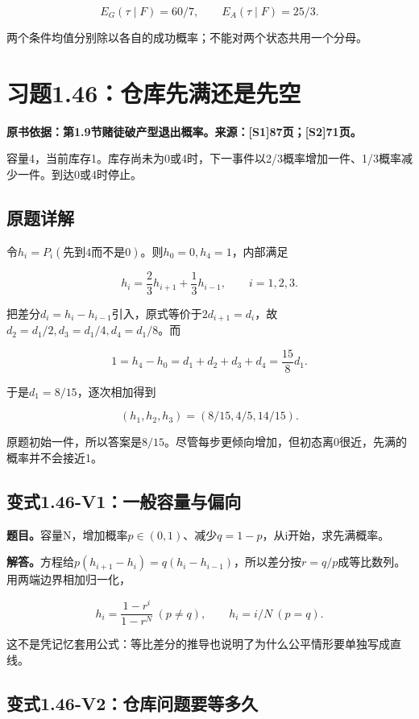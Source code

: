 \documentclass[
  11pt,
  a4paper,
  UTF8,
  fontset=fandol]{ctexart}
\begin{document}
\[
\boxed{E_G(\tau\mid F)=60/7,\qquad E_A(\tau\mid F)=25/3.}
\]

两个条件均值分别除以各自的成功概率；不能对两个状态共用一个分母。

\section{习题1.46：仓库先满还是先空}\label{ux4e60ux98981.46ux4ed3ux5e93ux5148ux6ee1ux8fd8ux662fux5148ux7a7a}

\textbf{原书依据：第1.9节赌徒破产型退出概率。来源：{[}S1{]}87页；{[}S2{]}71页。}

容量4，当前库存1。库存尚未为0或4时，下一事件以2/3概率增加一件、1/3概率减少一件。到达0或4时停止。

\subsection{原题详解}\label{ux539fux9898ux8be6ux89e3-10}

令\(h_i=P_i(\text{先到4而不是0})\)。则\(h_0=0,h_4=1\)，内部满足

\[
h_i=\frac23h_{i+1}+\frac13h_{i-1},\qquad i=1,2,3.
\]

把差分\(d_i=h_i-h_{i-1}\)引入，原式等价于\(2d_{i+1}=d_i\)，故\(d_2=d_1/2,d_3=d_1/4,d_4=d_1/8\)。而

\[
1=h_4-h_0=d_1+d_2+d_3+d_4=\frac{15}{8}d_1.
\]

于是\(d_1=8/15\)，逐次相加得到

\[
\boxed{(h_1,h_2,h_3)=(8/15,4/5,14/15).}
\]

原题初始一件，所以答案是\(\boxed{8/15}\)。尽管每步更倾向增加，但初态离0很近，先满的概率并不会接近1。

\subsection{变式1.46-V1：一般容量与偏向}\label{ux53d8ux5f0f1.46-v1ux4e00ux822cux5bb9ux91cfux4e0eux504fux5411}

\textbf{题目。}容量N，增加概率\(p\in(0,1)\)、减少\(q=1-p\)，从i开始，求先满概率。

\textbf{解答。}方程给\(p(h_{i+1}-h_i)=q(h_i-h_{i-1})\)，所以差分按\(r=q/p\)成等比数列。用两端边界相加归一化，

\[
\boxed{h_i=\frac{1-r^i}{1-r^N}\ (p\ne q),\qquad h_i=i/N\ (p=q).}
\]

这不是凭记忆套用公式：等比差分的推导也说明了为什么公平情形要单独写成直线。

\subsection{变式1.46-V2：仓库问题要等多久}\label{ux53d8ux5f0f1.46-v2ux4ed3ux5e93ux95eeux9898ux8981ux7b49ux591aux4e45}
\end{document}
